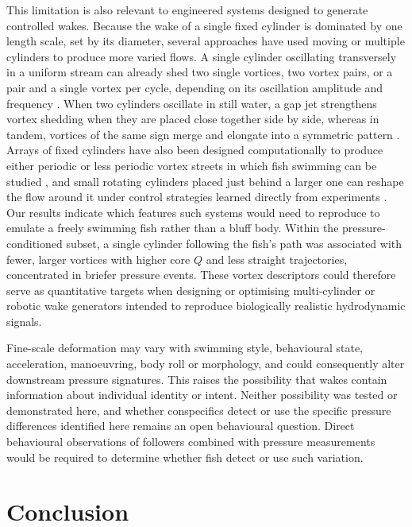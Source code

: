 \documentclass[openacc]{rsproca_new}
\begin{document}
This limitation is also relevant to engineered systems designed to generate controlled wakes. Because the wake of a single fixed cylinder is dominated by one length scale, set by its diameter, several approaches have used moving or multiple cylinders to produce more varied flows. A single cylinder oscillating transversely in a uniform stream can already shed two single vortices, two vortex pairs, or a pair and a single vortex per cycle, depending on its oscillation amplitude and frequency \cite{williamson1988}. When two cylinders oscillate in still water, a gap jet strengthens vortex shedding when they are placed close together side by side, whereas in tandem, vortices of the same sign merge and elongate into a symmetric pattern \cite{li2022}. Arrays of fixed cylinders have also been designed computationally to produce either periodic or less periodic vortex streets in which fish swimming can be studied \cite{sparks2024}, and small rotating cylinders placed just behind a larger one can reshape the flow around it under control strategies learned directly from experiments \cite{fan2020}. Our results indicate which features such systems would need to reproduce to emulate a freely swimming fish rather than a bluff body. Within the pressure-conditioned subset, a single cylinder following the fish's path was associated with fewer, larger vortices with higher core $Q$ and less straight trajectories, concentrated in briefer pressure events. These vortex descriptors could therefore serve as quantitative targets when designing or optimising multi-cylinder or robotic wake generators intended to reproduce biologically realistic hydrodynamic signals.

Fine-scale deformation may vary with swimming style, behavioural state, acceleration, manoeuvring, body roll or morphology, and could consequently alter downstream pressure signatures. This raises the possibility that wakes contain information about individual identity or intent. Neither possibility was tested or demonstrated here, and whether conspecifics detect or use the specific pressure differences identified here remains an open behavioural question. Direct behavioural observations of followers combined with pressure measurements would be required to determine whether fish detect or use such variation.

\section{Conclusion}
\end{document}

